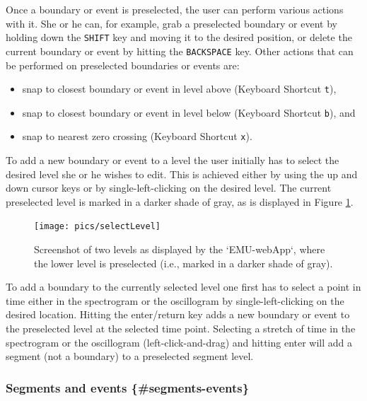 \documentclass[]{book}
\providecommand{\tightlist}{%
  \setlength{\itemsep}{0pt}\setlength{\parskip}{0pt}}
\begin{document}
Once a boundary or event is preselected, the user can perform various actions with it. She or he can, for example, grab a preselected boundary or event by holding down the \texttt{SHIFT} key and moving it to the desired position, or delete the current boundary or event by hitting the \texttt{BACKSPACE} key. Other actions that can be performed on preselected boundaries or events are:

\begin{itemize}
\tightlist
\item
  snap to closest boundary or event in level above (Keyboard Shortcut \texttt{t}),
\item
  snap to closest boundary or event in level below (Keyboard Shortcut \texttt{b}), and
\item
  snap to nearest zero crossing (Keyboard Shortcut \texttt{x}).
\end{itemize}

To add a new boundary or event to a level the user initially has to select the desired level she or he wishes to edit. This is achieved either by using the up and down cursor keys or by single-left-clicking on the desired level. The current preselected level is marked in a darker shade of gray, as is displayed in Figure \ref{fig:webApp-selectLevel}.

\begin{figure}

{\centering \texttt{[image: pics/selectLevel]} 

}

\caption{Screenshot of two levels as displayed by the `EMU-webApp`, where the lower level is preselected (i.e., marked in a darker shade of gray).}\label{fig:webApp-selectLevel}
\end{figure}

To add a boundary to the currently selected level one first has to select a point in time either in the spectrogram or the oscillogram by single-left-clicking on the desired location. Hitting the enter/return key adds a new boundary or event to the preselected level at the selected time point. Selecting a stretch of time in the spectrogram or the oscillogram (left-click-and-drag) and hitting enter will add a segment (not a boundary) to a preselected segment level.

\hypertarget{segments-and-events-segments-events}{%
\subsubsection*{Segments and events \{\#segments-events\}}\label{segments-and-events-segments-events}}
\end{document}

